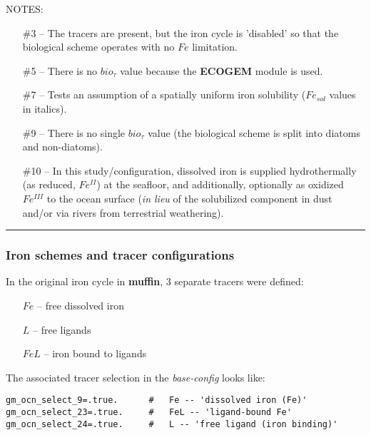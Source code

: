 \noindent \small NOTES: \normalsize
\vspace{1mm}
\footnotesize
\begin{itemize}[noitemsep]
\setlength{\itemindent}{-.15in}
\item [\#3] -- The tracers are present, but the iron cycle is 'disabled' so that the biological scheme operates with no \(Fe\) limitation.
\item [\#5] -- There is no \(bio_{\tau}\) value because the \textbf{ECOGEM} module is used.
\item [\#7] -- Tests an assumption of a spatially uniform iron solubility (\(Fe_{sol}\) values in italics).
\item [\#9] -- There is no single \(bio_{\tau}\) value (the biological scheme is split into diatoms and non-diatoms).
\item [\#10] -- In this study/configuration, dissolved iron is supplied hydrothermally (as reduced, \(Fe^{II}\)) at the seafloor, and additionally, optionally as oxidized \(Fe^{III}\) to the ocean surface (\textit{in lieu} of the solubilized component in dust and/or via rivers from terrestrial weathering).
\end{itemize}
\normalsize

%
\noindent\rule{4cm}{0.5pt}
\subsubsection{Iron schemes and tracer configurations}
\vspace{2mm}

In the original iron cycle in \textbf{muffin},  3 separate tracers were defined:
\vspace{1mm}
\begin{itemize}[noitemsep]
\item [\(Fe\)] -- free dissolved iron
\item [\(L\)] -- free ligands
\item [\(FeL\)] -- iron bound to ligands
\end{itemize}
\vspace{2mm}
The associated tracer selection in the \textit{base-config} looks like:
\small\vspace{-2pt}\begin{verbatim}
gm_ocn_select_9=.true.      #   Fe -- 'dissolved iron (Fe)'
gm_ocn_select_23=.true.     #   FeL -- 'ligand-bound Fe'
gm_ocn_select_24=.true.     #   L -- 'free ligand (iron binding)' 
\end{verbatim}\vspace{-2pt}\normalsize

